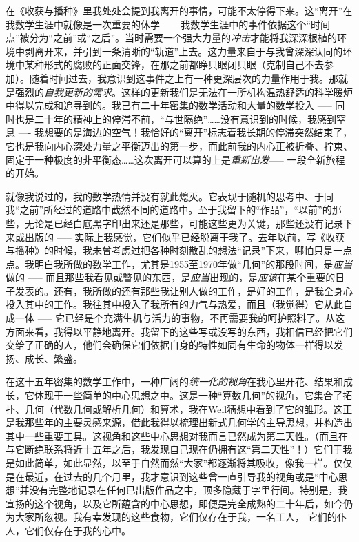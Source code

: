 \documentclass[oneside,12pt]{book}
\begin{document}
在《收获与播种》里我处处会提到我离开的事情，可能不太停得下来。这“离开”在我数学生涯中就像是一次重要的休学 ----- 我数学生涯中的事件依据这个“时间点”被分为“之前”或“之后”。当时需要一个强大力量的\emph{冲击}才能将我深深根植的环境中剥离开来，并引到一条清晰的“轨道”上去。这力量来自于与我曾深深认同的环境中某种形式的腐败\footnotemark 的正面交锋，在那之前\footnotemark 都睁只眼闭只眼（克制自己不去参加）。随着时间过去，我意识到这事件之上有一种更深层次的力量作用于我。那就是强烈的\emph{自我更新的需求}。这样的更新我们是无法在一所机构温热舒适的科学暖炉中得以完成和追寻到的。我已有二十年密集的数学活动和大量的数学投入 ----- 同时也是二十年的精神上的停滞不前，“与世隔绝”……没有意识到的时候，我感到窒息 ---- 我想要的是海边的空气！我恰好的“离开”标志着我长期的停滞突然结束了，它也是我向内心深处力量之平衡迈出的第一步，而此前我的内心正被折叠、拧束、固定于一种极度的非平衡态……这次离开可以算的上是\emph{重新出发}\footnotemark ----- 一段全新旅程的开始。
\addtocounter{footnote}{-2}
\addtocounter{footnote}{1}
\addtocounter{footnote}{1}

就像我说过的，我的数学热情并没有就此熄灭。它表现于随机的思考中、于同我“之前”所经过的道路中截然不同的道路中。至于我留下的“作品”，“以前”的那些，无论是已经白底黑字印出来还是那些，可能这些更为关键，那些还没有记录下来或出版的 ----- 实际上我感觉，它们似乎已经脱离于我了。去年以前，写《收获与播种》的时候，我未曾考虑过把各种时刻散乱的想法“记录”下来，哪怕只是一点点。我明白我所做的数学工作，尤其是1955至1970年做“几何”的那段时间，是\emph{应当}做的 ----- 而且那些我看见或瞥见的东西，是\emph{应当}出现的，是\emph{应该}在某个重要的日子发表的。还有，我所做的还有那些我让别人做的工作，是好的工作，是我全身心投入其中的工作。我往其中投入了我所有的力气与热爱，而且（我觉得）它从此自成一体 ----- 它已经是个充满生机与活力的事物，不再需要我的呵护照料了。从这方面来看，我得以平静地离开。我留下的这些写或没写的东西，我相信已经把它们交给了正确的人，他们会确保它们依据自身的特性如同有生命的物体一样得以发扬、成长、繁盛。

在这十五年密集的数学工作中，一种广阔的\emph{统一化的视角}在我心里开花、结果和成长，它体现于一些简单的中心思想之中。这是一种“算数几何”的视角，它集合了拓扑、几何（代数几何或解析几何）和算术，我在Weil猜想中看到了它的雏形。这正是我那些年的主要灵感来源，借此我得以梳理出新式几何学的主导思想，并构造出其中一些重要工具。这视角和这些中心思想对我而言已然成为第二天性。（而且在与它断绝联系将近十五年之后，我发现自己现在仍拥有这“第二天性”！）它们于我是如此简单，如此显然，以至于自然而然“大家”都逐渐将其吸收，像我一样。仅仅是在最近，在过去的几个月里，我才意识到这些曾一直引导我的视角或是“中心思想”并没有完整地记录在任何已出版作品之中，顶多隐藏于字里行间。特别是，我宣扬的这个视角，以及它所蕴含的中心思想，即便是完全成熟的二十年后，如今仍为大家所忽视。我有幸发现的这些食物，它们仅存在于我，一名工人\footnotemark，
它们的仆人，它们仅存在于我的心中。
\end{document}
